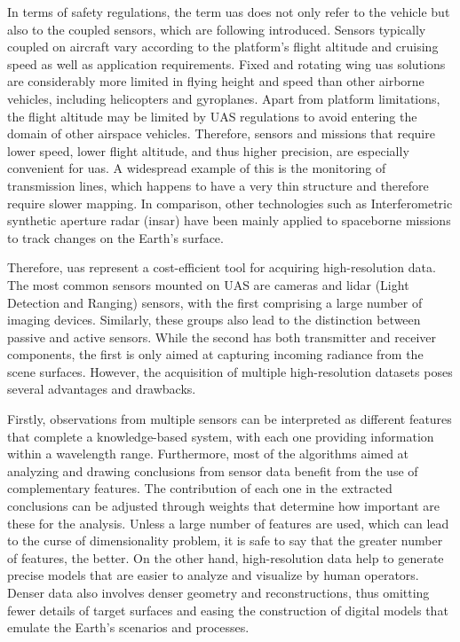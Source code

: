 In terms of safety regulations, the term \acrshort{uas} does not only refer to the vehicle but also to the coupled sensors, which are following introduced. Sensors typically coupled on aircraft vary according to the platform's flight altitude and cruising speed as well as application requirements. Fixed and rotating wing \acrshort{uas} solutions are considerably more limited in flying height and speed than other airborne vehicles, including helicopters and gyroplanes. Apart from platform limitations, the flight altitude may be limited by UAS regulations to avoid entering the domain of other airspace vehicles. Therefore, sensors and missions that require lower speed, lower flight altitude, and thus higher precision, are especially convenient for \acrshort{uas}. A widespread example of this is the monitoring of transmission lines, which happens to have a very thin structure and therefore require slower mapping. In comparison, other technologies such as Interferometric synthetic aperture radar (\acrshort{insar}) have been mainly applied to spaceborne missions to track changes on the Earth's surface.

Therefore, \acrshort{uas} represent a cost-efficient tool for acquiring high-resolution data. The most common sensors mounted on UAS are cameras and \acrshort{lidar} (Light Detection and Ranging) sensors, with the first comprising a large number of imaging devices. Similarly, these groups also lead to the distinction between passive and active sensors. While the second has both transmitter and receiver components, the first is only aimed at capturing incoming radiance from the scene surfaces. However, the acquisition of multiple high-resolution datasets poses several advantages and drawbacks. 

Firstly, observations from multiple sensors can be interpreted as different features that complete a knowledge-based system, with each one providing information within a wavelength range. Furthermore, most of the algorithms aimed at analyzing and drawing conclusions from sensor data benefit from the use of complementary features. The contribution of each one in the extracted conclusions can be adjusted through weights that determine how important are these for the analysis. Unless a large number of features are used, which can lead to the curse of dimensionality problem, it is safe to say that the greater number of features, the better. On the other hand, high-resolution data help to generate precise models that are easier to analyze and visualize by human operators. Denser data also involves denser geometry and reconstructions, thus omitting fewer details of target surfaces and easing the construction of digital models that emulate the Earth's scenarios and processes. 

